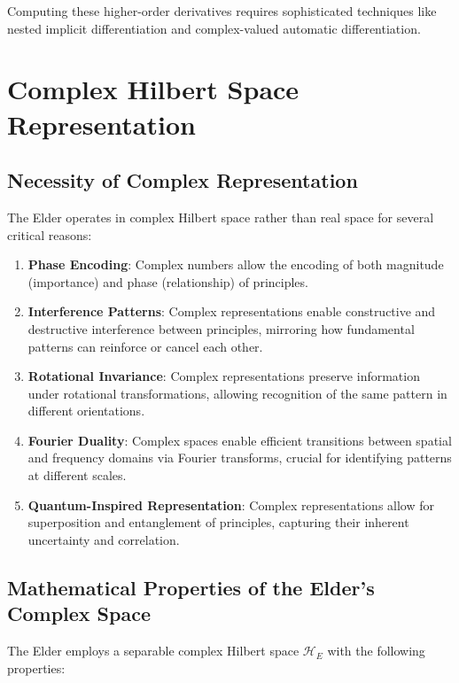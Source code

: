 Computing these higher-order derivatives requires sophisticated techniques like nested implicit differentiation and complex-valued automatic differentiation.

\section{Complex Hilbert Space Representation}

\subsection{Necessity of Complex Representation}

The Elder operates in complex Hilbert space rather than real space for several critical reasons:

\begin{enumerate}
\item \textbf{Phase Encoding}: Complex numbers allow the encoding of both magnitude (importance) and phase (relationship) of principles.

\item \textbf{Interference Patterns}: Complex representations enable constructive and destructive interference between principles, mirroring how fundamental patterns can reinforce or cancel each other.

\item \textbf{Rotational Invariance}: Complex representations preserve information under rotational transformations, allowing recognition of the same pattern in different orientations.

\item \textbf{Fourier Duality}: Complex spaces enable efficient transitions between spatial and frequency domains via Fourier transforms, crucial for identifying patterns at different scales.

\item \textbf{Quantum-Inspired Representation}: Complex representations allow for superposition and entanglement of principles, capturing their inherent uncertainty and correlation.
\end{enumerate}

\subsection{Mathematical Properties of the Elder's Complex Space}

The Elder employs a separable complex Hilbert space $\mathcal{H}_E$ with the following properties:

